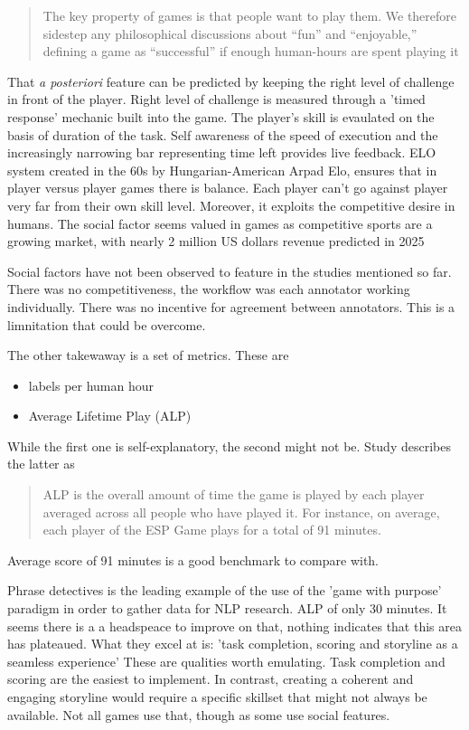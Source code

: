\documentclass{report}
\begin{document}
\begin{quote}
 The key property of games is that people want to play them. We therefore sidestep any philosophical discussions about “fun” and “enjoyable,” defining a game as “successful” if enough human-hours are spent playing it
\end{quote}
That  \textit{a posteriori} feature can be predicted by keeping the right level of challenge in front of the player.  \cite{locke_theory_1991}
Right level of challenge is measured through a 'timed response' mechanic built into the game.
The player's skill is evaulated on the basis of duration of the task. 
Self awareness of the speed of execution and the increasingly narrowing bar representing time left provides live feedback.
ELO system \cite{noauthor_elo_2023} created in the 60s by Hungarian-American Arpad Elo, ensures that in player versus player games there is balance. Each player can't go against player very far from their own skill level.
Moreover, it exploits the competitive desire in humans.
The social factor seems valued in games as competitive sports are a growing market, with nearly 2 million US dollars revenue predicted \cite{noauthor_global_nodate} in 2025

Social factors have not been observed to feature in the studies mentioned so far.
There was no competitiveness, the workflow was each annotator working individually.
There was no incentive for agreement between annotators.
This is a limnitation that could be overcome.

The other takewaway is a set of metrics. These are
\begin{itemize}
  \item labels per human hour
  \item Average Lifetime Play (ALP)
\end{itemize}
While the first one is self-explanatory, the second might not be.
Study describes the latter as 
\begin{quote}
 ALP is the overall amount of time the game is played by each player averaged across all people who have played it. For instance, on average, each player of the ESP Game plays for a total of 91 minutes.
\end{quote}
Average score of 91 minutes is a good benchmark to compare with.

Phrase detectives \cite{poesio_phrase_2013} is the leading example of the use of the 'game with purpose' paradigm in order to gather data for NLP research.
ALP of only 30 minutes. It seems there is a a headspeace to improve on that, nothing indicates that this area has plateaued.
What they excel at is: 'task completion, scoring and storyline as a seamless experience'
These are qualities worth emulating. Task completion and scoring are the easiest to implement. 
In contrast, creating a coherent and engaging storyline would require a specific skillset that might not always be available.
Not all games use that, though as some use social features.
\end{document}
